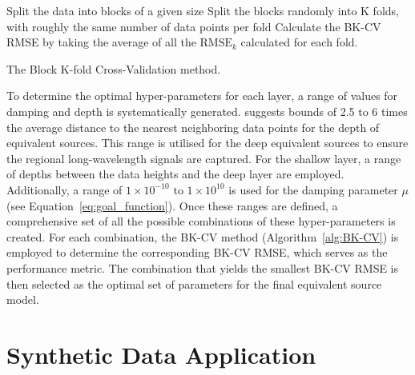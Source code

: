 \begin{algorithm}[!h]
    Split the data into blocks of a given size
    \;
    Split the blocks randomly into K folds, with roughly the same number of data points per fold
    \;
    Calculate the BK-CV RMSE by taking the average of all the $\text{RMSE}_k$ calculated for each fold.
    \BlankLine
    \caption{The Block K-fold Cross-Validation method.}
    \label{alg:BK-CV}
\end{algorithm}

To determine the optimal hyper-parameters for each layer, a range of values for damping and depth is systematically generated. \citet{Dampney1969} suggests bounds of 2.5 to 6 times the average distance to the nearest neighboring data points for the depth of equivalent sources. This range is utilised for the deep equivalent sources to ensure the regional long-wavelength signals are captured. For the shallow layer, a range of depths between the data heights and the deep layer are employed. Additionally, a range of $1 \times 10^{-10} \text{ to } 1 \times 10^{10}$ is used for the damping parameter $\mu$ (see Equation~\ref{eq:goal_function}). Once these ranges are defined, a comprehensive set of all the possible combinations of these hyper-parameters is created. For each combination, the BK-CV method (Algorithm~\ref{alg:BK-CV}) is employed to determine the corresponding BK-CV RMSE, which serves as the performance metric. The combination that yields the smallest BK-CV RMSE is then selected as the optimal set of parameters for the final equivalent source model.


\section{Synthetic Data Application}

